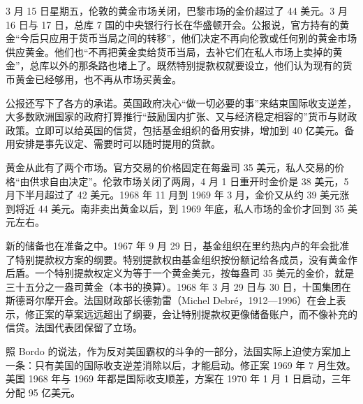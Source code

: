 3 月 15 日星期五，伦敦的黄金市场关闭，巴黎市场的金价超过了 44 美元\cite{bis36}。3 月 16 日与 17 日，总库 7 国的中央银行行长在华盛顿开会\cite{frus36}。公报说，官方持有的黄金“今后只应用于货币当局之间的转移”，他们决定不再向伦敦或任何别的黄金市场供应黄金\cite{frus36}。他们也“不再把黄金卖给货币当局，去补它们在私人市场上卖掉的黄金”，总库以外的那条路也堵上了\cite{frus36}。既然特别提款权就要设立，他们认为现有的货币黄金已经够用，也不再从市场买黄金\cite{frus36}。

公报还写下了各方的承诺。英国政府决心“做一切必要的事”来结束国际收支逆差，大多数欧洲国家的政府打算推行“鼓励国内扩张、又与经济稳定相容的”货币与财政政策\cite{frus36}。立即可以给英国的信贷，包括基金组织的备用安排，增加到 40 亿美元\cite{frus36}。备用安排是事先议定、需要时可以随时提用的贷款。

黄金从此有了两个市场。官方交易的价格固定在每盎司 35 美元，私人交易的价格“由供求自由决定”\cite{frus36}。伦敦市场关闭了两周，4 月 1 日重开时金价是 38 美元，5 月下半月超过了 42 美元\cite{bis36}。1968 年 11 月到 1969 年 3 月，金价又从约 39 美元涨到将近 44 美元\cite{bis36}。南非卖出黄金以后，到 1969 年底，私人市场的金价才回到 35 美元左右\cite{garber1993}。

新的储备也在准备之中。1967 年 9 月 29 日，基金组织在里约热内卢的年会批准了特别提款权方案的纲要\cite{frus36}。特别提款权由基金组织按份额记给各成员，没有黄金作后盾\cite{bordo1993}。一个特别提款权定义为等于一个黄金美元\cite{bordo1993}，按每盎司 35 美元的金价，就是三十五分之一盎司黄金（本书的换算）。1968 年 3 月 29 日与 30 日，十国集团在斯德哥尔摩开会\cite{frus36}。法国财政部长德勃雷（Michel Debré，1912—1996）在会上表示，修正案的草案远远超出了纲要，会让特别提款权更像储备账户，而不像补充的信贷\cite{frus36,loc36}。法国代表团保留了立场\cite{frus36}。

照 Bordo 的说法，作为反对美国霸权的斗争的一部分，法国实际上迫使方案加上一条：只有美国的国际收支逆差消除以后，才能启动\cite{bordo1993}。修正案 1969 年 7 月生效\cite{garber1993}。美国 1968 年与 1969 年都是国际收支顺差，方案在 1970 年 1 月 1 日启动，三年分配 95 亿美元\cite{bordo1993}。

